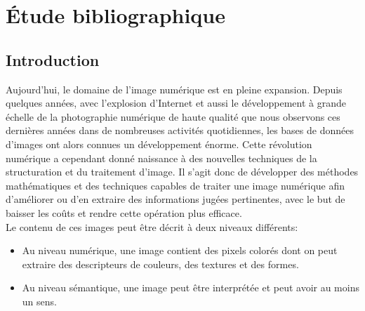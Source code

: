 
\chapter{Étude bibliographique} %

\label{ChapterX} %


\section{Introduction}
Aujourd’hui, le domaine de l'image numérique est en pleine expansion. Depuis quelques années, avec l'explosion d'Internet et aussi le développement à grande échelle de la photographie numérique de haute qualité que nous observons ces dernières années dans de nombreuses activités quotidiennes, les bases de données d'images ont alors connues un développement énorme. Cette révolution numérique a cependant donné naissance à des nouvelles techniques de la structuration et du traitement d'image. Il s'agit donc de développer des méthodes mathématiques et des techniques capables de traiter une image numérique afin d’améliorer ou d’en extraire des informations jugées pertinentes, avec le but de baisser les coûts et rendre cette opération plus efficace.\\

Le contenu de ces images peut être décrit à deux niveaux différents:
 
\begin{itemize}
	\item Au niveau numérique, une image contient des pixels colorés dont on peut extraire des descripteurs de couleurs, des textures et des formes.
	
	\item Au niveau sémantique, une image peut être interprétée et peut avoir au moins un sens. 
\end{itemize}

